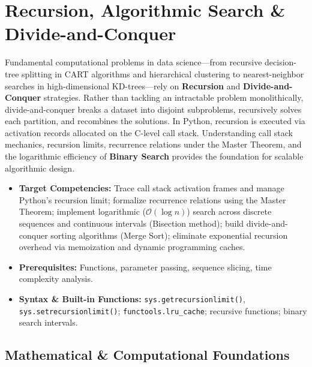 \chapter{Recursion, Algorithmic Search \& Divide-and-Conquer}

Fundamental computational problems in data science---from recursive decision-tree splitting in CART algorithms and hierarchical clustering to nearest-neighbor searches in high-dimensional KD-trees---rely on \textbf{Recursion} and \textbf{Divide-and-Conquer} strategies. Rather than tackling an intractable problem monolithically, divide-and-conquer breaks a dataset into disjoint subproblems, recursively solves each partition, and recombines the solutions. In Python, recursion is executed via activation records allocated on the C-level call stack. Understanding call stack mechanics, recursion limits, recurrence relations under the Master Theorem, and the logarithmic efficiency of \textbf{Binary Search} provides the foundation for scalable algorithmic design.

\vspace{0.5cm}
\begin{tcolorbox}[colback=primarylight, colframe=primarydark, title={\textbf{Executive Roadmap \& Learning Objectives}}]
\begin{itemize}
    \item \textbf{Target Competencies:} Trace call stack activation frames and manage Python's recursion limit; formalize recurrence relations using the Master Theorem; implement logarithmic ($\mathcal{O}(\log n)$) search across discrete sequences and continuous intervals (Bisection method); build divide-and-conquer sorting algorithms (Merge Sort); eliminate exponential recursion overhead via memoization and dynamic programming caches.
    \item \textbf{Prerequisites:} Functions, parameter passing, sequence slicing, time complexity analysis.
    \item \textbf{Syntax \& Built-in Functions:} \texttt{sys.getrecursionlimit()}, \texttt{sys.setrecursionlimit()}; \texttt{functools.lru\_cache}; recursive functions; binary search intervals.
\end{itemize}
\end{tcolorbox}

\section{Mathematical \& Computational Foundations}

